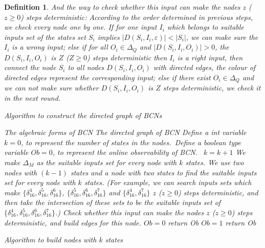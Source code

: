 \documentclass[conference]{IEEEtran} %
\newtheorem{definition}{Definition}
\begin{document}
\begin{definition}
And the way to check whether this input can make the nodes $z$ ($z\ge0$) steps deterministic: According to the order determined in previous steps, we check every node one by one. If for one input $I_i$ which belongs to suitable inputs set of the states set $S_i$ implies $|D\left(S_i,I_i,\varepsilon\right)|<|S_i|$, we can make sure the $I_i$ is a wrong input; else if for all $O_i \in \Delta_Q$ and $|D\left(S_i,I_i,O_i\right)|>0$, the $D\left(S_i,I_i,O_i\right)$ is $Z$ ($Z\ge 0$) steps deterministic then $I_i$ is a right input, then connect the node $S_i$ to all nodes $D\left(S_i,I_i,O_i\right)$ with directed edges, the colour of directed edges represent the corresponding input; else if there exist $O_i \in \Delta_Q$ and we can not make sure whether $D\left(S_i,I_i,O_i\right)$ is $Z$ steps deterministic, we check it in the next round. 
\begin{algorithm}[h]
\caption{Algorithm to construct the directed graph of BCNs}
\begin{algorithmic}[1]
\REQUIRE 
The algebraic forms of BCN
\ENSURE  
The directed graph of BCN
\STATE Define a int variable $k=0$, to represent the number of states in the nodes.\
\STATE Define a boolean type variable $Ob=0$, to represent the online observability of BCN.\
\STATE $k= k+1$
\STATE We make $\Delta_M$ as the suitable inputs set for every node with $k$ states.
\ELSE
\IF{$k>2$}
\STATE We use two nodes with $(k-1)$ states and a node with two states to find the suitable inputs set for every node with $k$ states. (For example, we can search inputs sets which make $\{\delta_{16}^4,\delta_{16}^5,\delta_{16}^6\}$, $\{\delta_{16}^5,\delta_{16}^6,\delta_{16}^7\}$ and $\{\delta_{16}^4,\delta_{16}^7\}$ $z$ ($z\ge0$) steps deterministic, and then take the intersection of these sets to be the suitable inputs set of $\{\delta_{16}^4,\delta_{16}^5,\delta_{16}^6,\delta_{16}^7\}$.) 
\ENDIF
\ENDIF
{}
\STATE Check whether this input can make the nodes $z$ ($z\ge0$) steps deterministic, and build edges for this node.
\ENDFOR
\ENDFOR
{}
\STATE $Ob=0$ return Ob
\ENDIF
\ENDWHILE
\STATE $Ob=1$ return Ob
\end{algorithmic}
\end{algorithm}
\begin{algorithm}[h]
\caption{Algorithm to build nodes with $k$ states}
\begin{algorithmic}[1]
\REQUIRE 

\end{algorithmic}
\end{algorithm}
\end{definition}
\end{document}
